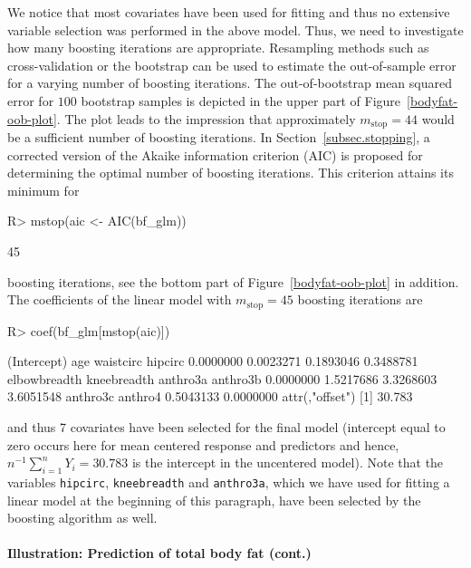 \documentclass{article}
\newcommand{\Robject}[1]{\texttt{#1}}
\newenvironment{Schunk}{}{}
\begin{document}
We notice that most covariates have been used for fitting
and thus no extensive variable selection was performed in the above model. 
Thus, we need to investigate how many boosting iterations are appropriate. Resampling
methods such as cross-validation or the bootstrap can be used to estimate
the out-of-sample error for a varying number of boosting iterations. The
out-of-bootstrap mean  
squared error for $100$ bootstrap samples is depicted in the upper part of 
Figure~\ref{bodyfat-oob-plot}. The plot
leads to the impression that approximately $m_\text{stop} = 44$ would be a sufficient
number of boosting iterations.
In Section~\ref{subsec.stopping}, a corrected version of the Akaike
information criterion (AIC) is proposed for determining the optimal number
of boosting iterations. This criterion attains its 
minimum for
\begin{Schunk}
\begin{Sinput}
R> mstop(aic <- AIC(bf_glm))
\end{Sinput}
\begin{Soutput}
[1] 45
\end{Soutput}
\end{Schunk}
boosting iterations, see the bottom part of
Figure~\ref{bodyfat-oob-plot} in addition.
The coef\-ficients of the linear model with 
$m_\text{stop} = 45$ 
boosting iterations are
\begin{Schunk}
\begin{Sinput}
R> coef(bf_glm[mstop(aic)])
\end{Sinput}
\begin{Soutput}
 (Intercept)          age    waistcirc      hipcirc 
   0.0000000    0.0023271    0.1893046    0.3488781 
elbowbreadth  kneebreadth     anthro3a     anthro3b 
   0.0000000    1.5217686    3.3268603    3.6051548 
    anthro3c      anthro4 
   0.5043133    0.0000000 
attr(,"offset")
[1] 30.783
\end{Soutput}
\end{Schunk}
and thus 7 covariates have been selected for the final
model (intercept equal to zero occurs here for mean centered response and
predictors and hence, 
$n^{-1} \sum_{i=1}^n Y_i = 30.783$
is the intercept in the uncentered model). Note that    
the variables \Robject{hipcirc}, \Robject{kneebreadth} and
\Robject{anthro3a}, which 
we have used for fitting a linear model at the beginning of this
paragraph, have been selected by the boosting algorithm as well.  


 

\paragraph{Illustration: Prediction of total body fat (cont.)}
\end{document}

